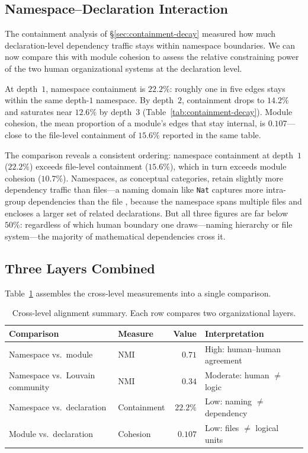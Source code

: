 \subsection{Namespace--Declaration Interaction}
\label{sec:ns-decl-interaction}

The containment analysis of \S\ref{sec:containment-decay} measured how much declaration-level dependency traffic stays within namespace boundaries. We can now compare this with module cohesion to assess the relative constraining power of the two human organizational systems at the declaration level.

At depth~$1$, namespace containment is $22.2\%$: roughly one in five edges stays within the same depth-$1$ namespace. By depth~$2$, containment drops to $14.2\%$ and saturates near $12.6\%$ by depth~$3$ (Table~\ref{tab:containment-decay}). Module cohesion, the mean proportion of a module's edges that stay internal, is $0.107$---close to the file-level containment of $15.6\%$ reported in the same table.

The comparison reveals a consistent ordering: namespace containment at depth~$1$ ($22.2\%$) exceeds file-level containment ($15.6\%$), which in turn exceeds module cohesion ($10.7\%$). Namespaces, as conceptual categories, retain slightly more dependency traffic than files---a naming domain like \texttt{Nat} captures more intra-group dependencies than the file , because the namespace spans multiple files and encloses a larger set of related declarations. But all three figures are far below~$50\%$: regardless of which human boundary one draws---naming hierarchy or file system---the majority of mathematical dependencies cross it.

\subsection{Three Layers Combined}
\label{sec:three-layers}

Table~\ref{tab:three-layers} assembles the cross-level measurements into a single comparison.

\begin{table}[ht]
\centering
\caption{Cross-level alignment summary. Each row compares two organizational layers.}
\label{tab:three-layers}
\begin{tabular}{llrl}
\toprule
Comparison & Measure & Value & Interpretation \\
\midrule
Namespace vs.\ module            & NMI          & $0.71$  & High: human--human agreement \\
Namespace vs.\ Louvain community & NMI          & $0.34$  & Moderate: human $\neq$ logic \\
Namespace vs.\ declaration       & Containment  & $22.2\%$ & Low: naming $\neq$ dependency \\
Module vs.\ declaration          & Cohesion     & $0.107$ & Low: files $\neq$ logical units \\
\bottomrule
\end{tabular}
\end{table}

